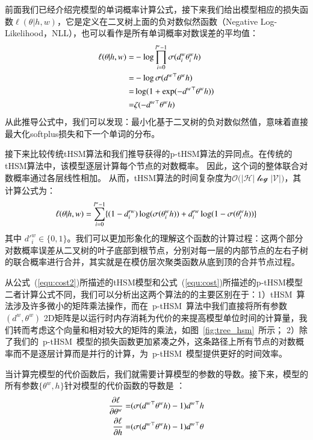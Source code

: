 前面我们已经介绍完模型的单词概率计算公式，接下来我们给出模型相应的损失函数$ \ell(\theta | h,w)$，它是定义在二叉树上面的负对数似然函数（Negative Log-Likelihood，NLL），也可以看作是所有单词概率对数误差的平均值：
\begin{equation}\label{equ:cost}
\setlength{\abovedisplayskip}{10pt}
\setlength{\belowdisplayskip}{10pt}
\begin{split}
   \ell(\theta|h,w) =&-\log\prod_{i=0}^{l^w -1} \sigma(d_i^w \theta_{i}^w h) \\
   =& -\log \sigma({d^w}^\top \theta^w h)\\
    =& \log (1+\exp(- {d^w}^\top \theta^w h )) \\
    =&  \zeta(- {d^w}^\top \theta^w h )
\end{split}
\end{equation}
从此推导公式中，我们可以发现：最小化基于二叉树的负对数似然值，意味着直接最大化softplus损失和下一个单词的分布。

接下来比较传统tHSM算法和我们推导获得的p-tHSM算法的异同点。在传统的tHSM算法中，该模型逐层计算每个节点的对数概率。 因此，这个词的整体联合对数概率通过各层线性相加。 从而，tHSM算法的时间复杂度为$\mathcal{O(|H|\log|V|})$，其计算公式为：
\begin{equation}\label{equ:cost2}
\setlength{\abovedisplayskip}{10pt}
\setlength{\belowdisplayskip}{10pt}
\ell(\theta|h,w) =\sum_{i=0}^{l^w-1} \{(1-d'^w_i)\log (\sigma(\theta_{i}^w h))  + {d'^w_i}\log (1-\sigma (\theta_{i}^w h))\}
\end{equation}
其中 $d'^w_i\in \{0,1\}$。我们可以更加形象化的理解这个函数的计算过程：这两个部分对数概率误差从二叉树的叶子底部到根节点，分别对每一层的内部节点的左右子树的联合概率进行合并，其实就是在模仿层次聚类函数从底到顶的合并节点过程。

从公式~(\ref{equ:cost2})所描述的tHSM模型和公式~(\ref{equ:cost})所描述的p-tHSM模型二者计算公式不同，我们可以分析出这两个算法的的主要区别在于：1）tHSM~算法涉及许多微小的矩阵乘法操作，而在~p-tHSM~算法中我们直接将所有参数$(d^w,\theta^w)$ 2D矩阵是以运行时内存消耗为代价的来提高模型单位时间的计算量，我们转而考虑这个向量和相对较大的矩阵的乘法，如图~\ref{fig:tree_hsm}~所示； 2）除了我们的~p-tHSM~模型的损失函数更加紧凑之外，这条路径上所有节点的对数概率而不是逐层计算而是并行的计算，为~p-tHSM~模型提供更好的时间效率。

当计算完模型的代价函数后，我们就需要计算模型的参数的导数。接下来，模型的所有参数$\{\theta^w,h\}$针对模型的代价函数的导数是 ：
\begin{equation}
\setlength{\abovedisplayskip}{10pt}
\setlength{\belowdisplayskip}{10pt}
\begin{split}
\frac{\partial \ell}{\partial \theta^w}=&(\sigma({d^w}^\top\theta^w h) -1){d^w}^\top h \\
\frac{\partial \ell}{\partial h}=&(\sigma({d^w}^\top \theta^w h) -1){d^w}^\top \theta
\end{split}
\end{equation}


